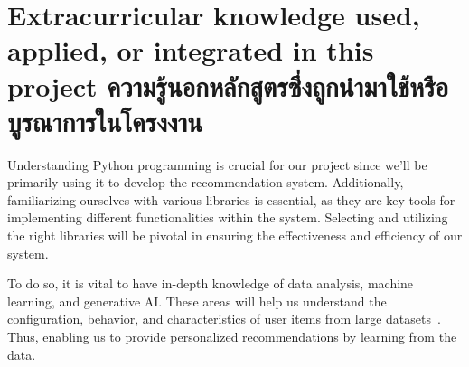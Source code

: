 \section{\ifenglish%
Extracurricular knowledge used, applied, or integrated in this project
\else%
ความรู้นอกหลักสูตรซึ่งถูกนำมาใช้หรือบูรณาการในโครงงาน
\fi
}

Understanding Python programming is crucial for our project since we'll be primarily using it 
to develop the recommendation system. Additionally, familiarizing ourselves with various 
libraries is essential, as they are key tools for implementing different functionalities 
within the system. Selecting and utilizing the right libraries will be pivotal in ensuring 
the effectiveness and efficiency of our system.

To do so, it is vital to have in-depth knowledge of data analysis, machine learning, 
and generative AI. These areas will help us understand the configuration, behavior, and 
characteristics of user items from large datasets~\cite{Aguilar2017}. Thus, enabling us to provide personalized 
recommendations by learning from the data.